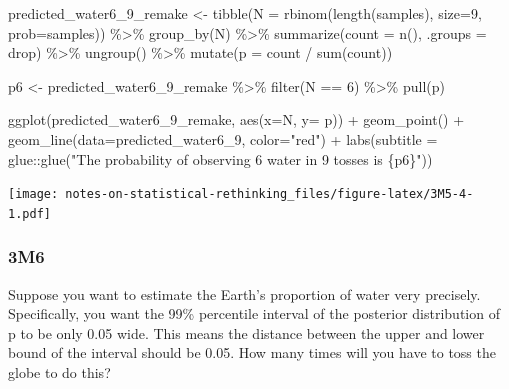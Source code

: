 \documentclass[
]{book}
\newenvironment{Shaded}{\begin{snugshade}}{\end{snugshade}}
\newcommand{\AttributeTok}[1]{\textcolor[rgb]{0.77,0.63,0.00}{#1}}
\newcommand{\DecValTok}[1]{\textcolor[rgb]{0.00,0.00,0.81}{#1}}
\newcommand{\FunctionTok}[1]{\textcolor[rgb]{0.00,0.00,0.00}{#1}}
\newcommand{\NormalTok}[1]{#1}
\newcommand{\OtherTok}[1]{\textcolor[rgb]{0.56,0.35,0.01}{#1}}
\newcommand{\SpecialCharTok}[1]{\textcolor[rgb]{0.00,0.00,0.00}{#1}}
\newcommand{\StringTok}[1]{\textcolor[rgb]{0.31,0.60,0.02}{#1}}
\begin{document}
\begin{Shaded}
\begin{Highlighting}[]
\NormalTok{predicted\_water6\_9\_remake }\OtherTok{\textless{}{-}} 
  \FunctionTok{tibble}\NormalTok{(}\AttributeTok{N =} \FunctionTok{rbinom}\NormalTok{(}\FunctionTok{length}\NormalTok{(samples), }\AttributeTok{size=}\DecValTok{9}\NormalTok{, }\AttributeTok{prob=}\NormalTok{samples)) }\SpecialCharTok{\%\textgreater{}\%}
  \FunctionTok{group\_by}\NormalTok{(N) }\SpecialCharTok{\%\textgreater{}\%}
  \FunctionTok{summarize}\NormalTok{(}\AttributeTok{count =} \FunctionTok{n}\NormalTok{(), }\AttributeTok{.groups =} \StringTok{\textquotesingle{}drop\textquotesingle{}}\NormalTok{)  }\SpecialCharTok{\%\textgreater{}\%}
  \FunctionTok{ungroup}\NormalTok{() }\SpecialCharTok{\%\textgreater{}\%}
  \FunctionTok{mutate}\NormalTok{(}\AttributeTok{p =}\NormalTok{ count }\SpecialCharTok{/} \FunctionTok{sum}\NormalTok{(count))}
  
\NormalTok{p6 }\OtherTok{\textless{}{-}} 
\NormalTok{  predicted\_water6\_9\_remake }\SpecialCharTok{\%\textgreater{}\%}
  \FunctionTok{filter}\NormalTok{(N }\SpecialCharTok{==} \DecValTok{6}\NormalTok{) }\SpecialCharTok{\%\textgreater{}\%}
  \FunctionTok{pull}\NormalTok{(p)}

\FunctionTok{ggplot}\NormalTok{(predicted\_water6\_9\_remake, }\FunctionTok{aes}\NormalTok{(}\AttributeTok{x=}\NormalTok{N, }\AttributeTok{y=}\NormalTok{ p)) }\SpecialCharTok{+} 
  \FunctionTok{geom\_point}\NormalTok{() }\SpecialCharTok{+} 
  \FunctionTok{geom\_line}\NormalTok{(}\AttributeTok{data=}\NormalTok{predicted\_water6\_9, }\AttributeTok{color=}\StringTok{"red"}\NormalTok{) }\SpecialCharTok{+}
  \FunctionTok{labs}\NormalTok{(}\AttributeTok{subtitle =}\NormalTok{ glue}\SpecialCharTok{::}\FunctionTok{glue}\NormalTok{(}\StringTok{"The probability of observing 6 water in 9 tosses is \{p6\}"}\NormalTok{))}
\end{Highlighting}
\end{Shaded}

\texttt{[image: notes-on-statistical-rethinking\_files/figure-latex/3M5-4-1.pdf]}

\hypertarget{m6-1}{%
\subsubsection*{3M6}\label{m6-1}}

Suppose you want to estimate the Earth's proportion of water very precisely. Specifically, you want the 99\% percentile interval of the posterior distribution of p to be only 0.05 wide. This means the distance between the upper and lower bound of the interval should be 0.05. How many times will you have to toss the globe to do this?
\end{document}
